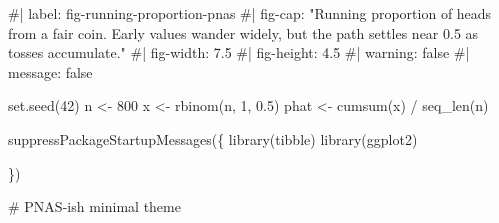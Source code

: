 \documentclass[
  letterpaper,
  DIV=11,
  numbers=noendperiod]{scrreprt}
\newenvironment{Shaded}{\begin{snugshade}}{\end{snugshade}}
\newcommand{\CommentTok}[1]{\textcolor[rgb]{0.37,0.37,0.37}{#1}}
\newcommand{\DecValTok}[1]{\textcolor[rgb]{0.68,0.00,0.00}{#1}}
\newcommand{\FloatTok}[1]{\textcolor[rgb]{0.68,0.00,0.00}{#1}}
\newcommand{\FunctionTok}[1]{\textcolor[rgb]{0.28,0.35,0.67}{#1}}
\newcommand{\NormalTok}[1]{\textcolor[rgb]{0.00,0.23,0.31}{#1}}
\newcommand{\OtherTok}[1]{\textcolor[rgb]{0.00,0.23,0.31}{#1}}
\newcommand{\SpecialCharTok}[1]{\textcolor[rgb]{0.37,0.37,0.37}{#1}}
\begin{document}
\begin{Shaded}
\begin{Highlighting}[]
\CommentTok{\#| label: fig{-}running{-}proportion{-}pnas}
\CommentTok{\#| fig{-}cap: "Running proportion of heads from a fair coin. Early values wander widely, but the path settles near 0.5 as tosses accumulate."}
\CommentTok{\#| fig{-}width: 7.5}
\CommentTok{\#| fig{-}height: 4.5}
\CommentTok{\#| warning: false}
\CommentTok{\#| message: false}

\FunctionTok{set.seed}\NormalTok{(}\DecValTok{42}\NormalTok{)}
\NormalTok{n }\OtherTok{\textless{}{-}} \DecValTok{800}
\NormalTok{x }\OtherTok{\textless{}{-}} \FunctionTok{rbinom}\NormalTok{(n, }\DecValTok{1}\NormalTok{, }\FloatTok{0.5}\NormalTok{)}
\NormalTok{phat }\OtherTok{\textless{}{-}} \FunctionTok{cumsum}\NormalTok{(x) }\SpecialCharTok{/} \FunctionTok{seq\_len}\NormalTok{(n)}

\FunctionTok{suppressPackageStartupMessages}\NormalTok{(\{}
\FunctionTok{library}\NormalTok{(tibble)}
\FunctionTok{library}\NormalTok{(ggplot2)}

\NormalTok{\})}

\CommentTok{\# PNAS{-}ish minimal theme}


\end{Highlighting}
\end{Shaded}
\end{document}
